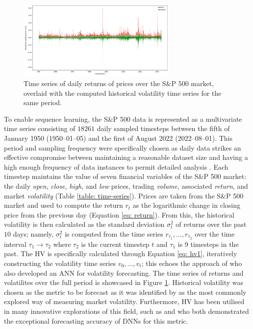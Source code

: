 \documentclass[a4paper, 11pt]{report}
\begin{document}
    \begin{figure}[ht]
        \centering
        \includegraphics[width=0.7\textwidth]{volatility.png}
        \caption{\centering Time series of daily returns of prices over the S\&P 500 market, overlaid with the computed historical volatility time series for the same period.}
        \label{fig: ret-vol}
    \end{figure}

    To enable sequence learning, the S\&P 500 data is represented as a multivariate time series consisting of $18261$ daily sampled timesteps between the fifth of January 1950 (1950--01--05) and the first of August 2022 (2022--08--01). This period and sampling frequency were specifically chosen as daily data strikes an effective compromise between maintaining a reasonable dataset size and having a high enough frequency of data instances to permit detailed analysis \citep{rodikov-2022}. Each timestep maintains the value of seven financial variables of the S\&P 500 market: the daily \emph{open}, \emph{close}, \emph{high}, and \emph{low} prices, trading \emph{volume}, associated \emph{return}, and market \emph{volatility} (Table \ref{table: time-series}). Prices are taken from the S\&P 500 market and used to compute the return $r_t$ as the logarithmic change in closing price from the previous day (Equation \ref{eq: return}). From this, the historical volatility is then calculated as the standard deviation $\sigma_{t}^2$ of returns over the past $10$ days; namely, $\sigma_{t}^2$ is computed from the time series $r_{\tau_1}, \ldots, r_{\tau_2}$ over the time interval $\tau_1 \to \tau_2$ where $\tau_2$ is the current timestep $t$ and $\tau_1$ is 9 timesteps in the past. The HV is specifically calculated through Equation \ref{eq: hv1}, iteratively constructing the volatility time series $v_0, \ldots, v_t$; this echoes the approach of \citet{lahmiri-2017} who also developed an ANN for volatility forecasting. The time series of returns and volatilites over the full period is showcased in Figure \ref{fig: ret-vol}. Historical volatility was chosen as the metric to be forecast as it was identified by \citet{ge-2022} as the most commonly explored way of measuring market volatility. Furthermore, HV has been utilised in many innovative explorations of this field, such as \citet{rahimikia-2020} and \citet{rodikov-2022} who both demonstrated the exceptional forecasting accuracy of DNNs for this metric.
\end{document}
